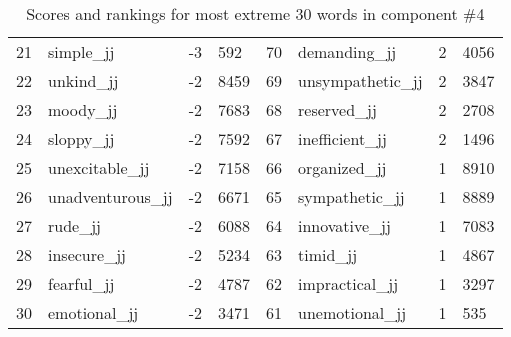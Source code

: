 \begin{table}[tbp]
\begin{tabular}{| rlr@{.}l | rlr@{.}l |}
    21 & simple\_jj & -3 & 592    &    70 & demanding\_jj & 2 & 4056 \\
    22 & unkind\_jj & -2 & 8459    &    69 & unsympathetic\_jj & 2 & 3847 \\
    23 & moody\_jj & -2 & 7683    &    68 & reserved\_jj & 2 & 2708 \\
    24 & sloppy\_jj & -2 & 7592    &    67 & inefficient\_jj & 2 & 1496 \\
    25 & unexcitable\_jj & -2 & 7158    &    66 & organized\_jj & 1 & 8910 \\
    26 & unadventurous\_jj & -2 & 6671    &    65 & sympathetic\_jj & 1 & 8889 \\
    27 & rude\_jj & -2 & 6088    &    64 & innovative\_jj & 1 & 7083 \\
    28 & insecure\_jj & -2 & 5234    &    63 & timid\_jj & 1 & 4867 \\
    29 & fearful\_jj & -2 & 4787    &    62 & impractical\_jj & 1 & 3297 \\
    30 & emotional\_jj & -2 & 3471    &    61 & unemotional\_jj & 1 & 535 \\
    \hline
    \end{tabular}
    \caption{Scores and rankings for most extreme 30 words in component \#4} 
\end{table}
\clearpage
